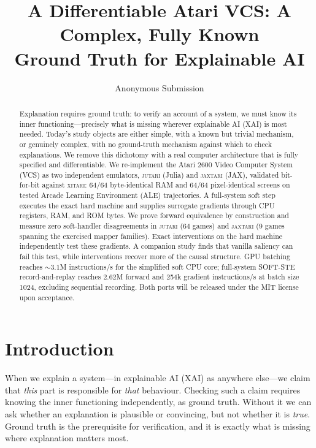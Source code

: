 \documentclass[letterpaper]{article} %
\title{A Differentiable Atari VCS: A Complex, Fully Known\\
Ground Truth for Explainable AI}
\author{
    Anonymous Submission
}
\begin{document}
\maketitle

\begin{abstract}
Explanation requires ground truth: to verify an account of a system, we must
know its inner functioning---precisely what is missing wherever explainable AI
(XAI) is most needed. Today's study objects are either simple, with a known
but trivial mechanism, or genuinely complex, with no ground-truth mechanism
against which to check explanations. We remove this dichotomy with a real
computer architecture that is fully specified and differentiable. We
re-implement the Atari 2600 Video Computer System (VCS) as two independent
emulators, \textsc{jutari} (Julia) and \textsc{jaxtari} (JAX), validated
bit-for-bit against \textsc{xitari}: 64/64 byte-identical RAM and 64/64
pixel-identical screens on tested Arcade Learning Environment (ALE)
trajectories. A full-system soft step executes the exact hard machine
and supplies surrogate gradients through CPU registers, RAM, and ROM bytes.
We prove forward equivalence by construction and
measure zero soft-handler disagreements in
\textsc{jutari} (64 games) and \textsc{jaxtari}
(9 games spanning the exercised mapper families). Exact interventions on
the hard machine independently test these gradients. A companion study
finds that vanilla saliency can fail this test, while interventions
recover more of the causal structure. GPU batching reaches ${\sim}3.1$M instructions/s for the
simplified soft CPU core; full-system SOFT-STE record-and-replay
reaches 2.62M forward and 254k gradient instructions/s
at batch size 1024, excluding sequential recording. Both ports
will be released under the MIT license upon acceptance.
\end{abstract}

\section{Introduction}

When we explain a system---in explainable AI (XAI) as anywhere else---we claim
that \emph{this} part is responsible for \emph{that} behaviour. Checking such a
claim requires knowing the inner functioning independently, as ground truth.
Without it we can ask whether an explanation is plausible or convincing, but not
whether it is \emph{true}. Ground truth is the prerequisite for verification, and
it is exactly what is missing where explanation matters most.
\end{document}
